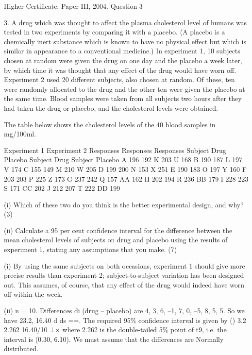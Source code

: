 \documentclass[a4paper,12pt]{article}
\begin{document}
Higher Certificate, Paper III, 2004.  Question 3 
\begin{framed}
 
 3. A drug which was thought to affect the plasma cholesterol level of humans was tested in two experiments by comparing it with a placebo.  (A placebo is a chemically inert substance which is known to have no physical effect but which is similar in appearance to a conventional medicine.)  In experiment 1, 10 subjects chosen at random were given the drug on one day and the placebo a week later, by which time it was thought that any effect of the drug would have worn off.  Experiment 2 used 20 different subjects, also chosen at random.  Of these, ten were randomly allocated to the drug and the other ten were given the placebo at the same time.  Blood samples were taken from all subjects two hours after they had taken the drug or placebo, and the cholesterol levels were obtained. 
 
The table below shows the cholesterol levels of the 40 blood samples in mg/100ml. 
 
Experiment 1 Experiment 2  Responses  Responses Responses Subject Drug Placebo Subject Drug Subject Placebo A 196 192 K 203 U 168 B 190 187 L 197 V 174 C 155 149 M 210 W 205 D 199 200 N 153 X 251 E 190 183 O 197 Y 160 F 203 203 P 225 Z 173 G 237 242 Q 157 AA 162 H 202 194 R 236 BB 179 I 228 223 S 171 CC 202 J 212 207 T 222 DD 199 
 
 
(i) Which of these two do you think is the better experimental design, and why? (3) 
 
(ii) Calculate a 95 per cent confidence interval for the difference between the mean cholesterol levels of subjects on drug and placebo using the results of experiment 1, stating any assumptions that you make. (7) 
\end{framed}

 
(i) By using the same subjects on both occasions, experiment 1 should give more precise results than experiment 2;  subject-to-subject variation has been designed out.  This assumes, of course, that any effect of the drug would indeed have worn off within the week. 
 
 
(ii) n = 10.  Differences di (drug – placebo) are 4, 3, 6, –1, 7, 0, –5, 8, 5, 5.  So we have 23.2, 16.40 d ds ==.  The required 95\% confidence interval is given by () 3.2 2.262 16.40/10 ±× where 2.262 is the double-tailed 5\% point of t9, i.e. the interval is (0.30, 6.10). We must assume that the differences are Normally distributed. 
 
\end{document}
